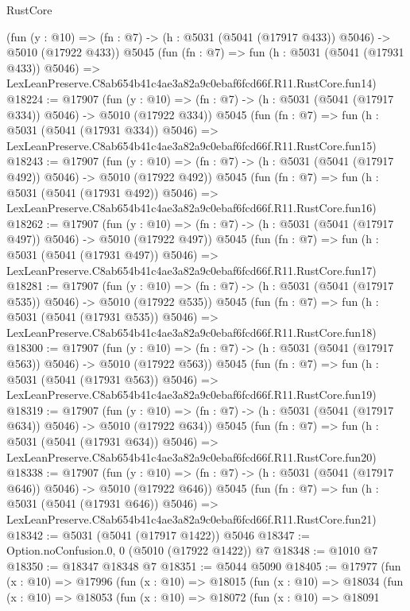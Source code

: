 \begin{lexlean}{RustCore}
\begin{coremodule}
    (fun (y : @10) => (fn : @7) -> (h : @5031 (@5041 (@17917 @433)) @5046) -> @5010 (@17922 @433))
    @5045
    (fun (fn : @7) =>
    fun (h : @5031 (@5041 (@17931 @433)) @5046) =>
    LexLeanPreserve.C8ab654b41c4ae3a82a9c0ebaf6fcd66f.R11.RustCore.fun14)
@18224 := @17907
    (fun (y : @10) => (fn : @7) -> (h : @5031 (@5041 (@17917 @334)) @5046) -> @5010 (@17922 @334))
    @5045
    (fun (fn : @7) =>
    fun (h : @5031 (@5041 (@17931 @334)) @5046) =>
    LexLeanPreserve.C8ab654b41c4ae3a82a9c0ebaf6fcd66f.R11.RustCore.fun15)
@18243 := @17907
    (fun (y : @10) => (fn : @7) -> (h : @5031 (@5041 (@17917 @492)) @5046) -> @5010 (@17922 @492))
    @5045
    (fun (fn : @7) =>
    fun (h : @5031 (@5041 (@17931 @492)) @5046) =>
    LexLeanPreserve.C8ab654b41c4ae3a82a9c0ebaf6fcd66f.R11.RustCore.fun16)
@18262 := @17907
    (fun (y : @10) => (fn : @7) -> (h : @5031 (@5041 (@17917 @497)) @5046) -> @5010 (@17922 @497))
    @5045
    (fun (fn : @7) =>
    fun (h : @5031 (@5041 (@17931 @497)) @5046) =>
    LexLeanPreserve.C8ab654b41c4ae3a82a9c0ebaf6fcd66f.R11.RustCore.fun17)
@18281 := @17907
    (fun (y : @10) => (fn : @7) -> (h : @5031 (@5041 (@17917 @535)) @5046) -> @5010 (@17922 @535))
    @5045
    (fun (fn : @7) =>
    fun (h : @5031 (@5041 (@17931 @535)) @5046) =>
    LexLeanPreserve.C8ab654b41c4ae3a82a9c0ebaf6fcd66f.R11.RustCore.fun18)
@18300 := @17907
    (fun (y : @10) => (fn : @7) -> (h : @5031 (@5041 (@17917 @563)) @5046) -> @5010 (@17922 @563))
    @5045
    (fun (fn : @7) =>
    fun (h : @5031 (@5041 (@17931 @563)) @5046) =>
    LexLeanPreserve.C8ab654b41c4ae3a82a9c0ebaf6fcd66f.R11.RustCore.fun19)
@18319 := @17907
    (fun (y : @10) => (fn : @7) -> (h : @5031 (@5041 (@17917 @634)) @5046) -> @5010 (@17922 @634))
    @5045
    (fun (fn : @7) =>
    fun (h : @5031 (@5041 (@17931 @634)) @5046) =>
    LexLeanPreserve.C8ab654b41c4ae3a82a9c0ebaf6fcd66f.R11.RustCore.fun20)
@18338 := @17907
    (fun (y : @10) => (fn : @7) -> (h : @5031 (@5041 (@17917 @646)) @5046) -> @5010 (@17922 @646))
    @5045
    (fun (fn : @7) =>
    fun (h : @5031 (@5041 (@17931 @646)) @5046) =>
    LexLeanPreserve.C8ab654b41c4ae3a82a9c0ebaf6fcd66f.R11.RustCore.fun21)
@18342 := @5031 (@5041 (@17917 @1422)) @5046
@18347 := Option.noConfusion.{0, 0} (@5010 (@17922 @1422)) @7
@18348 := @1010 @7
@18350 := @18347 @18348 @7
@18351 := @5044 @5090
@18405 := @17977
    (fun (x : @10) =>
    @17996
      (fun (x : @10) =>
      @18015
        (fun (x : @10) =>
        @18034
          (fun (x : @10) =>
          @18053
            (fun (x : @10) =>
            @18072
              (fun (x : @10) =>
              @18091

\end{coremodule}
\end{lexlean}
